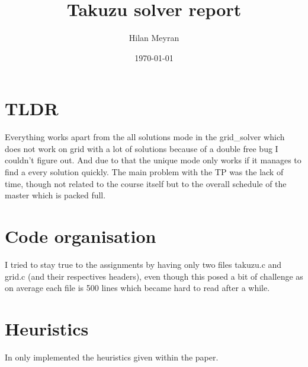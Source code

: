 \documentclass{article}
\begin{document}
\title{Takuzu solver report}
\author{Hilan Meyran}
\date{\today}

\maketitle

\section{TLDR}

Everything works apart from the all solutions mode in the grid\_solver which does not work on grid with a lot of solutions because of a double free bug I couldn't figure out.
And due to that the unique mode only works if it manages to find a every solution quickly.
The main problem with the TP was the lack of time, though not related to the course itself but to the overall schedule of the master which is packed full.

\section{Code organisation}

I tried to stay true to the assignments by having only two files takuzu.c and grid.c (and their respectives headers), even though this posed a bit of challenge as on average
each file is 500 lines which became hard to read after a while.

\section{Heuristics}

In only implemented the heuristics given within the paper.
\end{document}
